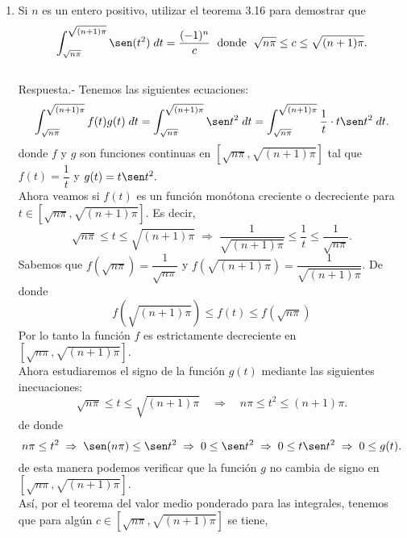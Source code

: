 \begin{enumerate}[\bfseries 1.]
\begin{enumerate}[a)]
	\end{enumerate}

    \item Si $n$ es un entero positivo, utilizar el teorema 3.16 para demostrar que
    $$\int_{\sqrt{n\pi}}^{\sqrt{(n+1)\pi}}\sen(t^2)\; dt = \dfrac{(-1)^n}{c}\; \mbox{ donde }\; \sqrt{n\pi}\leq c \leq \sqrt{(n+1)\pi}.$$\\
	Respuesta.-\; Tenemos las siguientes ecuaciones:
	$$\int_{\sqrt{n\pi}}^{\sqrt{(n+1)\pi}} f(t) g(t)\; dt = \int_{\sqrt{n\pi}}^{\sqrt{(n+1)\pi}}\sen t^2\; dt = \int_{\sqrt{n\pi}}^{\sqrt{(n+1)\pi}} \dfrac{1}{t}\cdot t\sen t^2\; dt.$$
	donde $f$ y $g$ son funciones continuas en $\left[\sqrt{n\pi},\sqrt{(n+1)\pi}\right]$ tal que $f(t)=\dfrac{1}{t}$ y $g(t)=t\sen t^2.$\\
	Ahora veamos si $f(t)$ es un función monótona creciente o decreciente para $t\in \left[\sqrt{n\pi},\sqrt{(n+1)\pi}\right]$. Es decir, 
	$$\sqrt{n\pi}\leq t\leq \sqrt{(n+1)\pi}\; \Rightarrow \; \dfrac{1}{\sqrt{(n+1)\pi}}\leq \dfrac{1}{t}\leq \dfrac{1}{\sqrt{n\pi}}.$$
	Sabemos que $f\left(\sqrt{n\pi}\right)=\dfrac{1}{\sqrt{n\pi}}$ y $f\left(\sqrt{(n+1)\pi}\right)=\dfrac{1}{\sqrt{(n+1)\pi}}$. De donde
	$$f\left(\sqrt{(n+1)\pi}\right)\leq f(t)\leq f\left(\sqrt{n\pi}\right)$$
	Por lo tanto la función $f$ es estrictamente decreciente en $\left[\sqrt{n\pi},\sqrt{(n+1)\pi}\right]$.\\
	Ahora estudiaremos el signo de la función $g(t)$ mediante las siguientes inecuaciones:
	$$\sqrt{n\pi}\leq t \leq \sqrt{(n+1)\pi}\quad \Rightarrow \quad n\pi\leq t^2\leq (n+1)\pi.$$
	de donde 
	$$n\pi \leq t^2 \; \Rightarrow \; \sen(n\pi) \leq \sen t^2 \; \Rightarrow \; 0\leq \sen t^2 \; \Rightarrow \; 0\leq t\sen t^2\; \Rightarrow \; 0\leq g(t).$$
	de esta manera podemos verificar que la función $g$ no cambia de signo en $\left[\sqrt{n\pi},\sqrt{(n+1)\pi}\right]$.\\
	Así, por el teorema del valor medio ponderado para las integrales, tenemos que para algún $c \in \left[\sqrt{n\pi},\sqrt{(n+1)\pi}\right]$ se tiene,


\end{enumerate}
